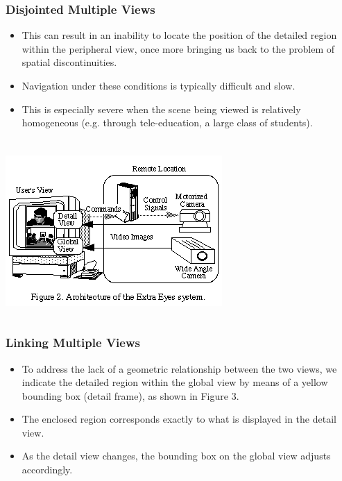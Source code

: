 \documentclass{beamer}
\begin{document}
\begin{frame}
\frametitle{Disjointed Multiple Views}

\begin{itemize}
\item This can result in an inability to locate the position of the detailed region within the peripheral view, once more bringing us back to the problem of spatial discontinuities.
\item Navigation under these conditions is typically difficult and slow.
\item This is especially severe when the scene being viewed is relatively homogeneous (e.g. through tele-education, a large class of students).
\end{itemize}

\end{frame}

\begin{frame}
\frametitle{}


\begin{columns}

\centerline{\includegraphics[width=0.500000\linewidth,keepaspectratio]{ky_fg2.png}}

\end{columns}

\end{frame}

\begin{frame}
\frametitle{Linking Multiple Views}

\begin{itemize}
\item To address the lack of a geometric relationship between the two views, we indicate the detailed region within the global view by means of a yellow bounding box (detail frame), as shown in Figure 3.
\item The enclosed region corresponds exactly to what is displayed in the detail view.
\item As the detail view changes, the bounding box on the global view adjusts accordingly.
\end{itemize}

\end{frame}
\end{document}
